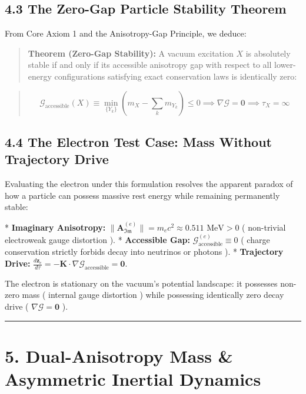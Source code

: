 \documentclass[11pt,a4paper]{article}
\theoremstyle{definition}\newtheorem{definition}{Definition}
\theoremstyle{remark}\newtheorem{remark}{Remark}
\begin{document}
\subsection{4.3 The Zero-Gap Particle Stability Theorem}

From Core Axiom 1 and the Anisotropy-Gap Principle, we deduce:

\begin{quote}\textbf{Theorem (Zero-Gap Stability):} A vacuum excitation $X$ is absolutely stable if and only if its accessible anisotropy gap with respect to all lower-energy configurations satisfying exact conservation laws is identically zero:\end{quote}
\begin{quote}\end{quote}
\begin{quote}
\begin{equation}
\mathcal{G}_{\text{accessible}}(X) \equiv \min_{\{Y_k\}} \left( m_X - \sum_k m_{Y_k} \right) \le 0 \implies \nabla \mathcal{G} = \mathbf{0} \implies \tau_X = \infty
\end{equation}
\end{quote}
\subsection{4.4 The Electron Test Case: Mass Without Trajectory Drive}

Evaluating the electron under this formulation resolves the apparent paradox of how a particle can possess massive rest energy while remaining permanently stable:

* \textbf{Imaginary Anisotropy:} $\|\mathbf{A}_{\mathfrak{Im}}^{(e)}\| = m_e c^2 \approx 0.511\text{ MeV} > 0$ ( non-trivial electroweak gauge distortion ).
* \textbf{Accessible Gap:} $\mathcal{G}_{\text{accessible}}^{(e)} \equiv 0$ ( charge conservation strictly forbids decay into neutrinos or photons ).
* \textbf{Trajectory Drive:} $\frac{d\mathbf{z}_e}{d\tau} = -\mathbf{K} \cdot \nabla \mathcal{G}_{\text{accessible}} = \mathbf{0}$.

The electron is stationary on the vacuum's potential landscape: it possesses non-zero mass ( internal gauge distortion ) while possessing identically zero decay drive ( $\nabla\mathcal{G} = \mathbf{0}$ ).

\noindent\rule{\linewidth}{0.4pt}
\section{5. Dual-Anisotropy Mass \& Asymmetric Inertial Dynamics}
\end{document}
